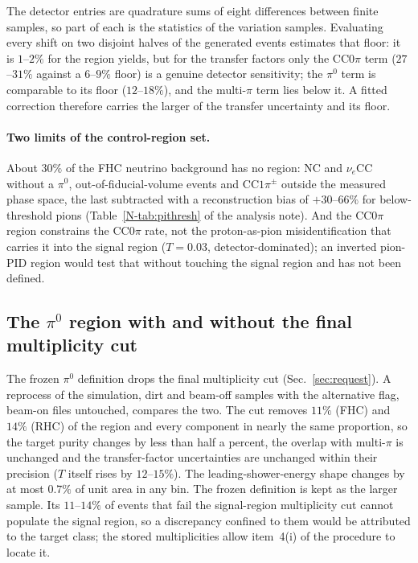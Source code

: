 \documentclass[11pt,a4paper]{article}
\newcommand{\noteref}[2]{#1~\ref{N-#2} of the analysis note}
\begin{document}
The detector entries are quadrature sums of eight differences between finite samples, so part of each is
the statistics of the variation samples. Evaluating every shift on two disjoint halves of the generated
events estimates that floor: it is $1$--$2\%$ for the region yields, but for the transfer factors only
the CC$0\pi$ term ($27$--$31\%$ against a $6$--$9\%$ floor) is a genuine detector sensitivity; the
$\pi^0$ term is comparable to its floor ($12$--$18\%$), and the multi-$\pi$ term lies below it. A fitted
correction therefore carries the larger of the transfer uncertainty and its floor.

\paragraph{Two limits of the control-region set.} About $30\%$ of the FHC neutrino background has no
region: NC and $\nu_e$CC without a $\pi^0$, out-of-fiducial-volume events and CC$1\pi^\pm$ outside the
measured phase space, the last subtracted with a reconstruction bias of $+30$--$66\%$ for below-threshold
pions (\noteref{Table}{tab:pithresh}). And the CC$0\pi$ region constrains the CC$0\pi$ rate, not the
proton-as-pion misidentification that carries it into the signal region ($T=0.03$, detector-dominated);
an inverted pion-PID region would test that without touching the signal region and has not been defined.

\subsection{The $\pi^0$ region with and without the final multiplicity cut}
\label{sec:cr_pi0_final}
The frozen $\pi^0$ definition drops the final multiplicity cut (Sec.~\ref{sec:request}). A reprocess of the
simulation, dirt and beam-off samples with the alternative flag, beam-on files untouched, compares the two.
The cut removes $11\%$ (FHC) and $14\%$ (RHC) of the region and every component in nearly the same
proportion, so the target purity changes by less than half a percent, the overlap with multi-$\pi$ is
unchanged and the transfer-factor uncertainties are unchanged within their precision ($T$ itself rises by
$12$--$15\%$). The leading-shower-energy shape changes by at most $0.7\%$ of unit area in any bin. The
frozen definition is kept as the larger sample. Its $11$--$14\%$ of events that fail the signal-region
multiplicity cut cannot populate the signal region, so a discrepancy confined to them would be attributed
to the target class; the stored multiplicities allow item~4(i) of the procedure to locate it.
\end{document}
